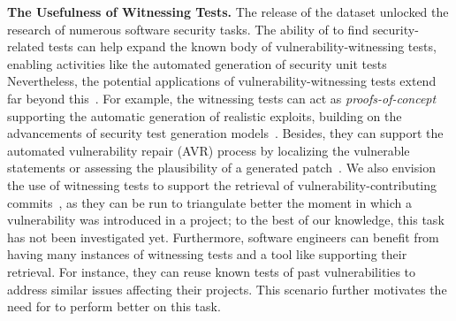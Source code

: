 \textbf{The Usefulness of Witnessing Tests.}
The release of the dataset \VulforJ unlocked the research of numerous software security tasks.
The ability of \vuteco to find security-related tests can help expand the known body of vulnerability-witnessing tests, enabling activities like the automated generation of security unit tests~\cite{kang:issta2022:transfer,zhang:2023:llm:sectests}
Nevertheless, the potential applications of vulnerability-witnessing tests extend far beyond this~\cite{pan:icse24:patch:presence}.
For example, the witnessing tests can act as \textit{proofs-of-concept} supporting the automatic generation of realistic exploits, building on the advancements of security test generation models~\cite{kang:issta2022:transfer,zhang:2023:llm:sectests}.
Besides, they can support the automated vulnerability repair (AVR) process by localizing the vulnerable statements or assessing the plausibility of a generated patch~\cite{Mohammadi:issrew2019:unit:tests:repair,Sagodi:ease24:avr:gpt4,Zhou:icse24:vulmaster,Bui:emse2024:apr4vul}.
We also envision the use of witnessing tests to support the retrieval of vulnerability-contributing commits~\cite{bao2022v}, as they can be run to triangulate better the moment in which a vulnerability was introduced in a project; to the best of our knowledge, this task has not been investigated yet.
Furthermore, software engineers can benefit from having many instances of witnessing tests and a tool like \vuteco supporting their retrieval.
For instance, they can reuse known tests of past vulnerabilities to address similar issues affecting their projects.
This scenario further motivates the need for \vuteco to perform better on this task.

